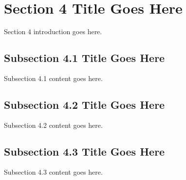 \section{Section 4 Title Goes Here}\label{sec:4}
Section 4 introduction goes here.

\subsection{Subsection 4.1 Title Goes Here}\label{subsec:4.1}
Subsection 4.1 content goes here.

\subsection{Subsection 4.2 Title Goes Here}\label{subsec:4.2}
Subsection 4.2 content goes here.

\subsection{Subsection 4.3 Title Goes Here}\label{subsec:4.3}
Subsection 4.3 content goes here.
